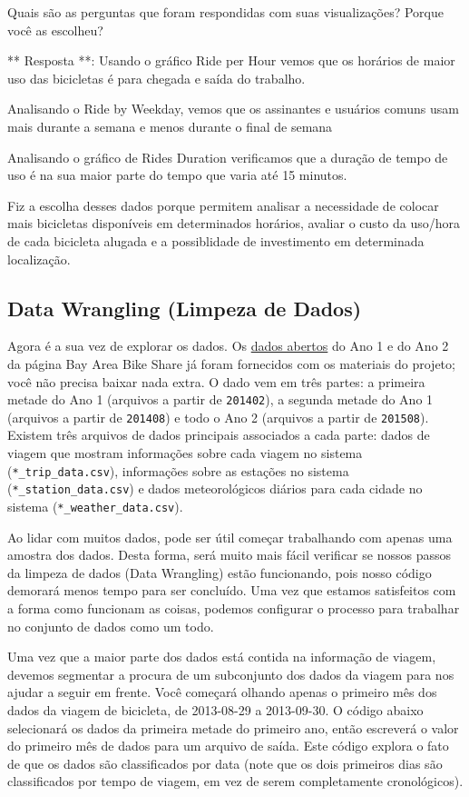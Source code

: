 \documentclass[11pt]{article}
\begin{document}
Quais são as perguntas que foram respondidas com suas visualizações?
Porque você as escolheu?

    ** Resposta **: Usando o gráfico Ride per Hour vemos que os horários de
maior uso das bicicletas é para chegada e saída do trabalho.

Analisando o Ride by Weekday, vemos que os assinantes e usuários comuns
usam mais durante a semana e menos durante o final de semana

Analisando o gráfico de Rides Duration verificamos que a duração de
tempo de uso é na sua maior parte do tempo que varia até 15 minutos.

Fiz a escolha desses dados porque permitem analisar a necessidade de
colocar mais bicicletas disponíveis em determinados horários, avaliar o
custo da uso/hora de cada bicicleta alugada e a possiblidade de
investimento em determinada localização.

    \subsection{Data Wrangling (Limpeza de
Dados)}\label{data-wrangling-limpeza-de-dados}

Agora é a sua vez de explorar os dados. Os
\href{http://www.bayareabikeshare.com/open-data}{dados abertos} do Ano 1
e do Ano 2 da página Bay Area Bike Share já foram fornecidos com os
materiais do projeto; você não precisa baixar nada extra. O dado vem em
três partes: a primeira metade do Ano 1 (arquivos a partir de
\texttt{201402}), a segunda metade do Ano 1 (arquivos a partir de
\texttt{201408}) e todo o Ano 2 (arquivos a partir de \texttt{201508}).
Existem três arquivos de dados principais associados a cada parte: dados
de viagem que mostram informações sobre cada viagem no sistema
(\texttt{*\_trip\_data.csv}), informações sobre as estações no sistema
(\texttt{*\_station\_data.csv}) e dados meteorológicos diários para cada
cidade no sistema (\texttt{*\_weather\_data.csv}).

Ao lidar com muitos dados, pode ser útil começar trabalhando com apenas
uma amostra dos dados. Desta forma, será muito mais fácil verificar se
nossos passos da limpeza de dados (Data Wrangling) estão funcionando,
pois nosso código demorará menos tempo para ser concluído. Uma vez que
estamos satisfeitos com a forma como funcionam as coisas, podemos
configurar o processo para trabalhar no conjunto de dados como um todo.

Uma vez que a maior parte dos dados está contida na informação de
viagem, devemos segmentar a procura de um subconjunto dos dados da
viagem para nos ajudar a seguir em frente. Você começará olhando apenas
o primeiro mês dos dados da viagem de bicicleta, de 2013-08-29 a
2013-09-30. O código abaixo selecionará os dados da primeira metade do
primeiro ano, então escreverá o valor do primeiro mês de dados para um
arquivo de saída. Este código explora o fato de que os dados são
classificados por data (note que os dois primeiros dias são
classificados por tempo de viagem, em vez de serem completamente
cronológicos).
\end{document}
